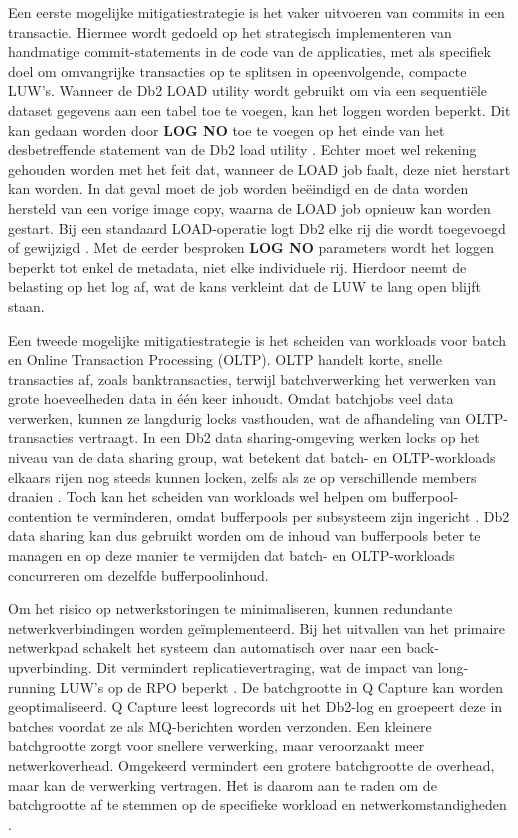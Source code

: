 Een eerste mogelijke mitigatiestrategie is het vaker uitvoeren van commits in een transactie.
Hiermee wordt gedoeld op het strategisch implementeren van handmatige commit-statements in de code van de applicaties, met als specifiek doel om omvangrijke transacties op te splitsen in opeenvolgende, compacte LUW's.
Wanneer de Db2 LOAD utility wordt gebruikt om via een sequentiële dataset gegevens aan een tabel toe te voegen, kan het loggen worden beperkt.
Dit kan gedaan worden door \textbf{LOG NO} toe te voegen op het einde van het desbetreffende statement van de Db2 load utility \autocite{ibm_2026_the_log_option_load_reorg_utilities}.
Echter moet wel rekening gehouden worden met het feit dat, wanneer de LOAD job faalt, deze niet herstart kan worden.
In dat geval moet de job worden beëindigd en de data worden hersteld van een vorige image copy, waarna de LOAD job opnieuw kan worden gestart.
Bij een standaard LOAD-operatie logt Db2 elke rij die wordt toegevoegd of gewijzigd \autocite{ibm_2026_syntax_load_utility_db2}.
Met de eerder besproken \textbf{LOG NO} parameters wordt het loggen beperkt tot enkel de metadata, niet elke individuele rij.
Hierdoor neemt de belasting op het log af, wat de kans verkleint dat de LUW te lang open blijft staan.

Een tweede mogelijke mitigatiestrategie is het scheiden van workloads voor batch en Online Transaction Processing (OLTP).
OLTP handelt korte, snelle transacties af, zoals banktransacties, terwijl batchverwerking het verwerken van grote hoeveelheden data in één keer inhoudt.
Omdat batchjobs veel data verwerken, kunnen ze langdurig locks vasthouden, wat de afhandeling van OLTP-transacties vertraagt.
In een Db2 data sharing-omgeving werken locks op het niveau van de data sharing group, wat betekent dat batch- en OLTP-workloads elkaars rijen nog steeds kunnen locken, zelfs als ze op verschillende members draaien \autocite{ibm_2026_introduction_db2_data_sharing}.
Toch kan het scheiden van workloads wel helpen om bufferpool-contention te verminderen, omdat bufferpools per subsysteem zijn ingericht \autocite{ibm_2026_buffer_pools}.
Db2 data sharing kan dus gebruikt worden om de inhoud van bufferpools beter te managen en op deze manier te vermijden dat batch- en OLTP-workloads concurreren om dezelfde bufferpoolinhoud.

Om het risico op netwerkstoringen te minimaliseren, kunnen redundante netwerkverbindingen worden geïmplementeerd. 
Bij het uitvallen van het primaire netwerkpad schakelt het systeem dan automatisch over naar een back-upverbinding.
Dit vermindert replicatievertraging, wat de impact van long-running LUW's op de RPO beperkt \autocite{ballard_2016_understanding_q_replication_high_availability}.
De batchgrootte in Q Capture kan worden geoptimaliseerd. 
Q Capture leest logrecords uit het Db2-log en groepeert deze in batches voordat ze als MQ-berichten worden verzonden. 
Een kleinere batchgrootte zorgt voor snellere verwerking, maar veroorzaakt meer netwerkoverhead. 
Omgekeerd vermindert een grotere batchgrootte de overhead, maar kan de verwerking vertragen. 
Het is daarom aan te raden om de batchgrootte af te stemmen op de specifieke workload en netwerkomstandigheden \autocite{ibm_2025_infosphere_batch_frequency_param}.

